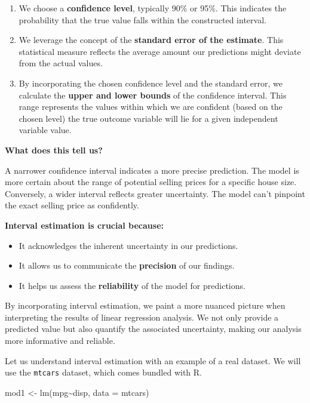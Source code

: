 \documentclass[
  letterpaper,
  paper =a4,
  twoside,
  openright,
  headsepline,
  footsepline,
  listof = totocnumbered,
  chapterprefix = true,
  firstiscover,
  parskip = full*]{scrbook}
\newenvironment{Shaded}{\begin{snugshade}}{\end{snugshade}}
\newcommand{\AttributeTok}[1]{\textcolor[rgb]{0.40,0.45,0.13}{#1}}
\newcommand{\FunctionTok}[1]{\textcolor[rgb]{0.28,0.35,0.67}{#1}}
\newcommand{\NormalTok}[1]{\textcolor[rgb]{0.00,0.23,0.31}{#1}}
\newcommand{\OtherTok}[1]{\textcolor[rgb]{0.00,0.23,0.31}{#1}}
\newcommand{\SpecialCharTok}[1]{\textcolor[rgb]{0.37,0.37,0.37}{#1}}
\begin{document}
\begin{enumerate}
\def\labelenumi{\arabic{enumi}.}
\item
  We choose a \textbf{confidence level}, typically 90\% or 95\%. This
  indicates the probability that the true value falls within the
  constructed interval.
\item
  We leverage the concept of the \textbf{standard error of the
  estimate}. This statistical measure reflects the average amount our
  predictions might deviate from the actual values.
\item
  By incorporating the chosen confidence level and the standard error,
  we calculate the \textbf{upper and lower bounds} of the confidence
  interval. This range represents the values within which we are
  confident (based on the chosen level) the true outcome variable will
  lie for a given independent variable value.
\end{enumerate}

\textbf{What does this tell us?}

A narrower confidence interval indicates a more precise prediction. The
model is more certain about the range of potential selling prices for a
specific house size. Conversely, a wider interval reflects greater
uncertainty. The model can't pinpoint the exact selling price as
confidently.

\textbf{Interval estimation is crucial because:}

\begin{itemize}
\item
  It acknowledges the inherent uncertainty in our predictions.
\item
  It allows us to communicate the \textbf{precision} of our findings.
\item
  It helps us assess the \textbf{reliability} of the model for
  predictions.
\end{itemize}

By incorporating interval estimation, we paint a more nuanced picture
when interpreting the results of linear regression analysis. We not only
provide a predicted value but also quantify the associated uncertainty,
making our analysis more informative and reliable.

Let us understand interval estimation with an example of a real dataset.
We will use the \texttt{mtcars} dataset, which comes bundled with R.

\begin{Shaded}
\begin{Highlighting}[]
\NormalTok{mod1 }\OtherTok{\textless{}{-}} \FunctionTok{lm}\NormalTok{(mpg}\SpecialCharTok{\textasciitilde{}}\NormalTok{disp, }\AttributeTok{data =}\NormalTok{ mtcars)}
\end{Highlighting}
\end{Shaded}
\end{document}
